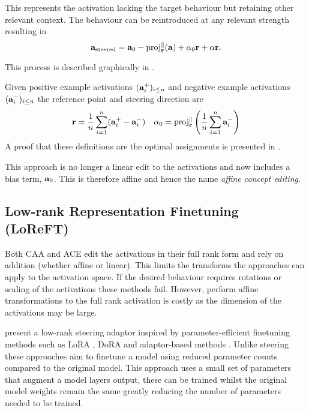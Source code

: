This represents the activation lacking the target behaviour but retaining other relevant context.
The behaviour can be reintroduced at any relevant strength resulting in
\begin{equation}
    \label{eq:ace}
    \mathbf{a}_\text{steered} = \mathbf{a}_0 - \text{proj}_{\mathbf{r}}^{\parallel}(\mathbf{a}) + \alpha_0\mathbf{r} + \alpha\mathbf{r}.
\end{equation}

This process is described graphically in .

Given positive example activations $(\mathbf{a}_i^+)_{i\le n}$ and negative example activations $(\mathbf{a}_i^-)_{i\le n}$ the reference point and steering direction are
\begin{align*}
    \mathbf{r} = \frac{1}{n}\sum_{i=1}^{n}(\mathbf{a}_i^+ - \mathbf{a}_i^-) && \alpha_0 = \text{proj}_{\mathbf{r}}^\parallel\left(\frac{1}{n}\sum_{i=1}^{n}\mathbf{a}_i^-\right)
\end{align*}
A proof that these definitions are the optimal assignments is presented in .

This approach is no longer a linear edit to the activations and now includes a bias term, $\mathbf{a}_0$.
This is therefore affine and hence the name \emph{affine concept editing}.

\subsection{Low-rank Representation Finetuning (LoReFT)}
\label{loreft}

Both CAA \citep{caa} and ACE \citep{ace} edit the activations in their full rank form and rely on addition (whether affine or linear).
This limits the transforms the approaches can apply to the activation space.
If the desired behaviour requires rotations or scaling of the activations these methods fail.
However, perform affine transformations to the full rank activation is costly as the dimension of the activations may be large.

\citet{reft} present a low-rank steering adaptor inspired by parameter-efficient finetuning methods such as LoRA \citep{lora}, DoRA \citep{dora} and adaptor-based methods \citep{petl}.
Unlike steering these approaches aim to finetune a model using reduced parameter counts compared to the original model.
This approach uses a small set of parameters that augment a model layers output, these can be trained whilst the original model weights remain the same greatly reducing the number of parameters needed to be trained.

